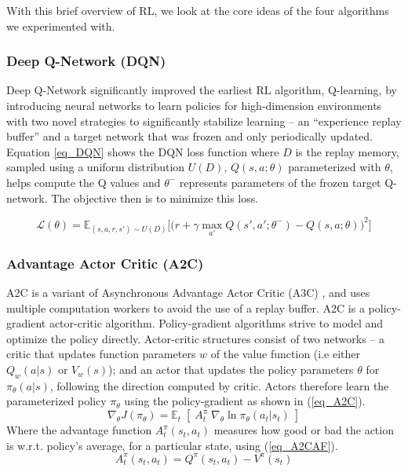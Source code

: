 \documentclass[referee, sn-mathphys-num]{sn-jnl}
\begin{document}
	With this brief overview of RL, we look at the core ideas of the four algorithms we experimented with.
	
	\subsubsection*{Deep Q-Network (DQN)}
	Deep Q-Network \cite{DQN-mnih2013} significantly improved the earliest RL algorithm, Q-learning, by introducing neural networks to learn policies for high-dimension environments with two novel strategies to significantly stabilize learning -- an ``experience replay buffer'' and a target network that was frozen and only periodically updated. Equation \eqref{eq_DQN} shows the DQN loss function where $D$ is the replay memory, sampled using a uniform distribution $U(D)$, $Q(s, a; \theta)$ parameterized with $\theta$, helps compute the Q values and $\theta^{-}$ represents parameters of the frozen target Q-network. The objective then is to minimize this loss.
	
	\begin{equation}\label{eq_DQN}
		\mathcal{L}(\theta) = \mathbb{E}_{(s, a, r, s') \sim U(D)} \Big[ \big( r + \gamma \max_{a'} Q(s', a'; \theta^{-}) - Q(s, a; \theta) \big)^2 \Big]
	\end{equation}
	
	\subsubsection*{Advantage Actor Critic (A2C)}
	
	A2C is a variant of Asynchronous Advantage Actor Critic (A3C) \cite{A2C-mnih2016}, and uses multiple computation workers to avoid the use of a replay buffer. A2C is a policy-gradient actor-critic algorithm. Policy-gradient algorithms strive to model and optimize the policy directly. Actor-critic structures consist of two networks -- a critic that updates function parameters $w$ of the value function (i.e either $Q_w(a \vert s)$ or $V_w(s)$); and an actor that updates the policy parameters $\theta$ for $\pi_\theta(a \vert s)$, following the direction computed by critic. Actors therefore learn the parameterized policy $\pi_{\theta}$ using the policy-gradient as shown in (\ref{eq_A2C}). 
	\begin{equation}\label{eq_A2C}
		\nabla_ \theta J(\pi_\theta) = \mathbb{E}_t \; [ \; A^\pi_t \; \nabla_\theta \ln \pi_\theta(a_t \vert s_t) \;]
	\end{equation}
	Where the advantage function $A^\pi_t (s_t, a_t)$ measures how good or bad the action is w.r.t. policy's average, for a particular state, using (\ref{eq_A2CAF}).
	\begin{equation}\label{eq_A2CAF}
		A^\pi_t (s_t, a_t) = Q^\pi (s_t, a_t) - V^\pi (s_t)
	\end{equation}
	
\end{document}
